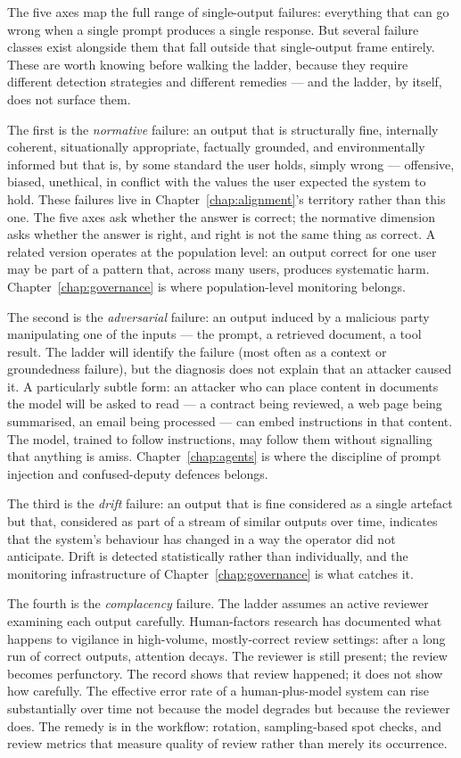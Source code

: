 The five axes map the full range of single-output failures:
everything that can go wrong when a single prompt produces a
single response. But several failure classes exist alongside
them that fall outside that single-output frame entirely.
These are worth knowing before walking the ladder, because
they require different detection strategies and different
remedies --- and the ladder, by itself, does not surface them.

The first is the \emph{normative} failure: an output that is
structurally fine, internally coherent, situationally
appropriate, factually grounded, and environmentally informed
but that is, by some standard the user holds, simply wrong
--- offensive, biased, unethical, in conflict with the values
the user expected the system to hold. These failures live in
Chapter~\ref{chap:alignment}'s territory rather than this one. The five axes
ask whether the answer is correct; the normative dimension
asks whether the answer is right, and right is not the same
thing as correct. A related version operates at the
population level: an output correct for one user may be part
of a pattern that, across many users, produces systematic
harm. Chapter~\ref{chap:governance} is where population-level monitoring belongs.

The second is the \emph{adversarial} failure: an output
induced by a malicious party manipulating one of the inputs
--- the prompt, a retrieved document, a tool result. The
ladder will identify the failure (most often as a context or
groundedness failure), but the diagnosis does not explain that
an attacker caused it. A particularly subtle form: an
attacker who can place content in documents the model will be
asked to read --- a contract being reviewed, a web page being
summarised, an email being processed --- can embed
instructions in that content. The model, trained to follow
instructions, may follow them without signalling that
anything is amiss. Chapter~\ref{chap:agents} is where the discipline of
prompt injection and confused-deputy defences belongs.

The third is the \emph{drift} failure: an output that is
fine considered as a single artefact but that, considered as
part of a stream of similar outputs over time, indicates that
the system's behaviour has changed in a way the operator did
not anticipate. Drift is detected statistically rather than
individually, and the monitoring infrastructure of
Chapter~\ref{chap:governance} is what catches it.

The fourth is the \emph{complacency} failure. The ladder
assumes an active reviewer examining each output carefully.
Human-factors research has documented what happens to
vigilance in high-volume, mostly-correct review settings:
after a long run of correct outputs, attention decays. The
reviewer is still present; the review becomes perfunctory.
The record shows that review happened; it does not show how
carefully. The effective error rate of a human-plus-model
system can rise substantially over time not because the model
degrades but because the reviewer does. The remedy is in the
workflow: rotation, sampling-based spot checks, and review
metrics that measure quality of review rather than merely its
occurrence.

